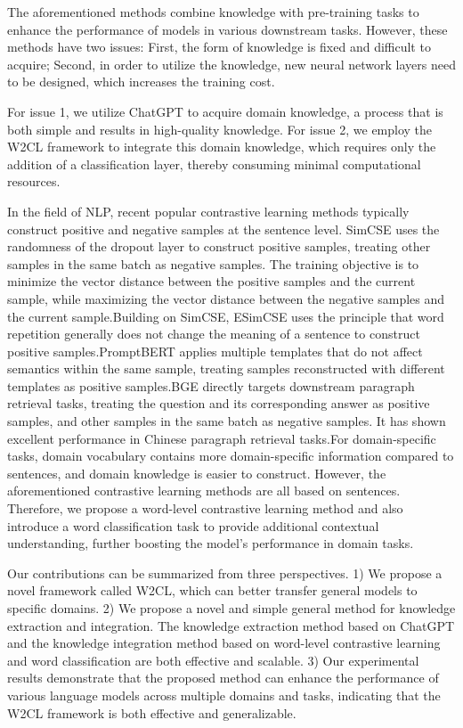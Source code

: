 The aforementioned methods combine knowledge with pre-training tasks to enhance the performance of models in various downstream tasks. However, these methods have two issues: First, the form of knowledge is fixed and difficult to acquire; Second, in order to utilize the knowledge, new neural network layers need to be designed, which increases the training cost.

For issue 1, we utilize ChatGPT to acquire domain knowledge, a process that is both simple and results in high-quality knowledge. For issue 2, we employ the W2CL framework to integrate this domain knowledge, which requires only the addition of a classification layer, thereby consuming minimal computational resources.

In the field of NLP, recent popular contrastive learning methods typically construct positive and negative samples at the sentence level. SimCSE\cite{simcse} uses the randomness of the dropout layer to construct positive samples, treating other samples in the same batch as negative samples. The training objective is to minimize the vector distance between the positive samples and the current sample, while maximizing the vector distance between the negative samples and the current sample.Building on SimCSE, ESimCSE\cite{esimcse} uses the principle that word repetition generally does not change the meaning of a sentence to construct positive samples.PromptBERT\cite{promptbert} applies multiple templates that do not affect semantics within the same sample, treating samples reconstructed with different templates as positive samples.BGE\cite{bge} directly targets downstream paragraph retrieval tasks, treating the question and its corresponding answer as positive samples, and other samples in the same batch as negative samples. It has shown excellent performance in Chinese paragraph retrieval tasks.For domain-specific tasks, domain vocabulary contains more domain-specific information compared to sentences, and domain knowledge is easier to construct. However, the aforementioned contrastive learning methods are all based on sentences. Therefore, we propose a word-level contrastive learning method and also introduce a word classification task to provide additional contextual understanding, further boosting the model's performance in domain tasks.

Our contributions can be summarized from three perspectives. 1) We propose a novel framework called W2CL, which can better transfer general models to specific domains. 2) We propose a novel and simple general method for knowledge extraction and integration. The knowledge extraction method based on ChatGPT and the knowledge integration method based on word-level contrastive learning and word classification are both effective and scalable. 3) Our experimental results demonstrate that the proposed method can enhance the performance of various language models across multiple domains and tasks, indicating that the W2CL framework is both effective and generalizable.


